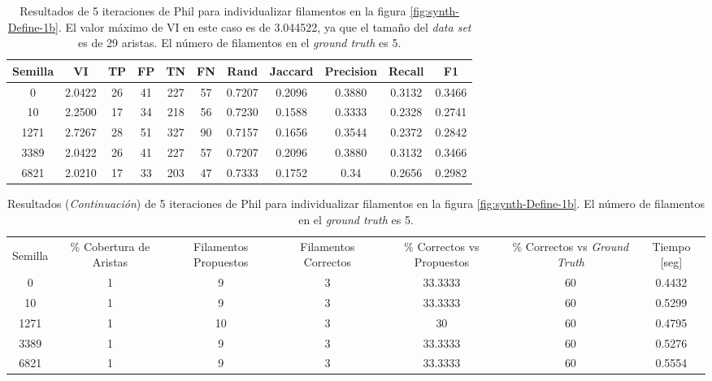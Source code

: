 \begin{table}[h]
    \centering
    \begin{tabular}{|c|c|c|c|c|c|c|c|c|c|c|}
    \hline
        Semilla & VI & TP & FP &TN &FN & Rand	& Jaccard &	Precision &	Recall &	F1 \\ \hline 
        0   & 2.0422 & 26 & 41 & 227 & 57 & 0.7207 & 0.2096 & 0.3880 & 0.3132 & 0.3466 \\
        10 & 2.2500 & 17 & 34 & 218 & 56 & 0.7230 & 0.1588 & 0.3333 & 0.2328 & 0.2741\\
        1271 & 2.7267 & 28 & 51 & 327 & 90 & 0.7157 & 0.1656 & 0.3544 & 0.2372 & 0.2842\\
        3389 & 2.0422 & 26 & 41 & 227 & 57 & 0.7207 & 0.2096 & 0.3880 & 0.3132 & 0.3466\\
        6821 & 2.0210 & 17 & 33 & 203 & 47 & 0.7333 & 0.1752 & 0.34 & 0.2656 & 0.2982\\
        \hline
    \end{tabular}
    \caption{Resultados de 5 iteraciones de Phil para individualizar filamentos en la figura \ref{fig:synth-Define-1b}. El valor m\'aximo de VI en este caso es de 3.044522, ya que el tama\~no del {\it data set} es de 29 aristas. El n\'umero de filamentos en el {\it ground truth} es 5.}
    \label{tab:Synth-Define-1b-DetailedResults1}
\end{table}
\addtocounter{table}{-1}
\begin{table}[h]
    \centering
    \begin{tabular}{|c|c|c|c|c|c|c|}
    \hline
         & \multirow{4}{2cm}{\centering \% Cobertura de Aristas} & \multirow{4}{2cm}{Filamentos Propuestos} & \multirow{4}{2cm}{Filamentos Correctos} & \multirow{4}{2.5cm}{\% Correctos vs Propuestos} & \multirow{4}{2.5cm}{\centering \% Correctos vs {\it Ground Truth}} & \multirow{4}{1.2cm}{\centering Tiempo [seg]} \\
         &  &  &  & & &  \\
        Semilla &  &  &  & & &  \\
        &  &  &  & & &  \\ \hline 
        0 & 1 & 9  & 3 & 33.3333 & 60 & 0.4432\\
        10 & 1 & 9  & 3 & 33.3333 & 60 & 0.5299\\
        1271 & 1 & 10 & 3 & 30 & 60 & 0.4795\\
        3389 & 1 & 9  & 3 & 33.3333 & 60 & 0.5276\\
        6821 & 1 & 9  & 3 & 33.3333 & 60 & 0.5554\\
        \hline
    \end{tabular}
    \caption{Resultados ({\it Continuaci\'on}) de 5 iteraciones de Phil para individualizar filamentos en la figura \ref{fig:synth-Define-1b}. El n\'umero de filamentos en el {\it ground truth} es 5.}
\end{table}

